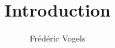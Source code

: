 \documentclass{../ucll-slides}
\title{Introduction}
\author{Fr\'ed\'eric Vogels}
\begin{document}
\begin{frame}
  \titlepage
\end{frame}

\begin{frame}
  
\end{frame}
\end{document}
